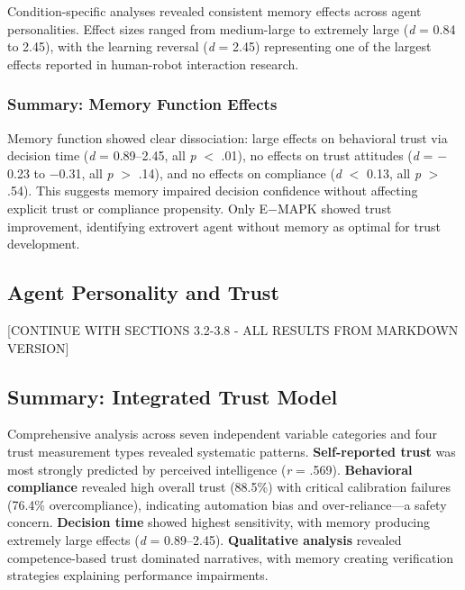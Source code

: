 \documentclass[12pt]{article}
\begin{document}
Condition-specific analyses revealed consistent memory effects across agent personalities. Effect sizes ranged from medium-large to extremely large (\textit{d} = 0.84 to 2.45), with the learning reversal (\textit{d} = 2.45) representing one of the largest effects reported in human-robot interaction research.

\subsubsection{Summary: Memory Function Effects}

Memory function showed clear dissociation: large effects on behavioral trust via decision time (\textit{d} = 0.89--2.45, all \textit{p} $<$ .01), no effects on trust attitudes (\textit{d} = $-$0.23 to $-$0.31, all \textit{p} $>$ .14), and no effects on compliance (\textit{d} $<$ 0.13, all \textit{p} $>$ .54). This suggests memory impaired decision confidence without affecting explicit trust or compliance propensity. Only E$-$MAPK showed trust improvement, identifying extrovert agent without memory as optimal for trust development.

\subsection{Agent Personality and Trust}

[CONTINUE WITH SECTIONS 3.2-3.8 - ALL RESULTS FROM MARKDOWN VERSION]



\subsection{Summary: Integrated Trust Model}

Comprehensive analysis across seven independent variable categories and four trust measurement types revealed systematic patterns. \textbf{Self-reported trust} was most strongly predicted by perceived intelligence (\textit{r} = .569). \textbf{Behavioral compliance} revealed high overall trust (88.5\%) with critical calibration failures (76.4\% overcompliance), indicating automation bias and over-reliance---a safety concern. \textbf{Decision time} showed highest sensitivity, with memory producing extremely large effects (\textit{d} = 0.89--2.45). \textbf{Qualitative analysis} revealed competence-based trust dominated narratives, with memory creating verification strategies explaining performance impairments.
\end{document}
